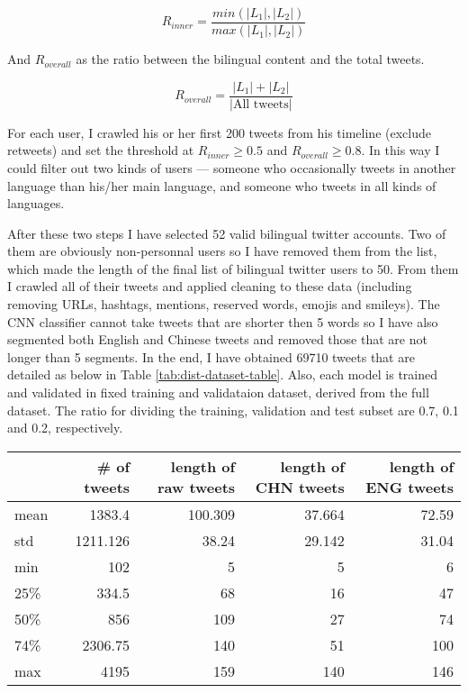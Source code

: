\documentclass[11pt,a4paper]{article}
\begin{document}
\begin{equation}
  R_{inner} = \frac{min(|L_1|, |L_2|)}{max(|L_1|, |L_2|)}
\end{equation}

And $R_{overall}$ as the ratio between the bilingual content and the total tweets.

\begin{equation}
  R_{overall} = \frac{|L_1|+|L_2|}{\text{|All tweets|}}
\end{equation}

For each user, I crawled his or her first 200 tweets from his timeline (exclude retweets) and set the threshold at $R_{inner} \ge 0.5$ and $R_{overall} \ge 0.8$. In this way I could filter out two kinds of users --- someone who occasionally tweets in another language than his/her main language, and someone who tweets in all kinds of languages.

After these two steps I have selected 52 valid bilingual twitter accounts. Two of them are obviously non-personnal users so I have removed them from the list, which made the length of the final list of bilingual twitter users to 50. From them I crawled all of their tweets and applied cleaning to these data (including removing URLs, hashtags, mentions, reserved words, emojis and smileys). The CNN classifier cannot take tweets that are shorter then 5 words so I have also segmented both English and Chinese tweets and removed those that are not longer than 5 segments. In the end, I have obtained 69710 tweets that are detailed as below in Table \ref{tab:dist-dataset-table}. Also, each model is trained and validated in fixed training and validataion dataset, derived from the full dataset. The ratio for dividing the training, validation and test subset are 0.7, 0.1 and 0.2, respectively.

\begin{table*}[t]
  \begin{center}
  \begin{tabular}{|l|r|r|r|r|}
  \hline \bf & \# of tweets & \bf length of raw tweets & \bf length of CHN tweets & \bf length of ENG tweets \\ \hline
  mean & 1383.4 & 100.309 & 37.664 & 72.59 \\
  std & 1211.126 & 38.24 & 29.142 & 31.04  \\
  min & 102 & 5 & 5 & 6 \\
  25\% & 334.5 & 68 & 16 & 47 \\
  50\% & 856 & 109 & 27 & 74 \\
  74\% & 2306.75 & 140 & 51 & 100 \\
  max & 4195 & 159 & 140 & 146 \\
  \hline
  \end{tabular}
  \end{center}
  \caption{\label{tab:dist-dataset-table} Distribution of the dataset}
\end{table*}
\end{document}
